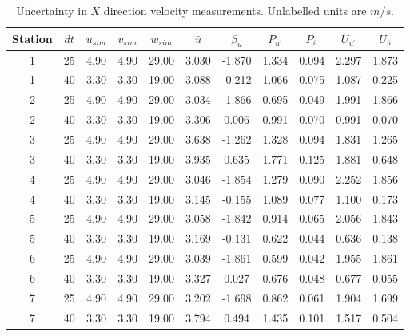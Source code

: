 \begin{table}[H]
\begin{center}
\begin{tabular}{|ccccccccccc|}
	\hline
	Station & $dt$ & $u_{sim}$ & $v_{sim}$ & $w_{sim}$ & $\bar{u}$ & $\beta_u$ & $P_{u^{\prime}}$ & $P_{\bar{u}}$ & $U_{u^{\prime}}$ & $U_{\bar{u}}$\\
	\hline
	1 & 25 & 4.90 & 4.90 & 29.00 & 3.030 & -1.870 & 1.334 & 0.094 & 2.297 & 1.873\\
	1 & 40 & 3.30 & 3.30 & 19.00 & 3.088 & -0.212 & 1.066 & 0.075 & 1.087 & 0.225\\
	2 & 25 & 4.90 & 4.90 & 29.00 & 3.034 & -1.866 & 0.695 & 0.049 & 1.991 & 1.866\\
	2 & 40 & 3.30 & 3.30 & 19.00 & 3.306 & 0.006 & 0.991 & 0.070 & 0.991 & 0.070\\
	3 & 25 & 4.90 & 4.90 & 29.00 & 3.638 & -1.262 & 1.328 & 0.094 & 1.831 & 1.265\\
	3 & 40 & 3.30 & 3.30 & 19.00 & 3.935 & 0.635 & 1.771 & 0.125 & 1.881 & 0.648\\
	4 & 25 & 4.90 & 4.90 & 29.00 & 3.046 & -1.854 & 1.279 & 0.090 & 2.252 & 1.856\\
	4 & 40 & 3.30 & 3.30 & 19.00 & 3.145 & -0.155 & 1.089 & 0.077 & 1.100 & 0.173\\
	5 & 25 & 4.90 & 4.90 & 29.00 & 3.058 & -1.842 & 0.914 & 0.065 & 2.056 & 1.843\\
	5 & 40 & 3.30 & 3.30 & 19.00 & 3.169 & -0.131 & 0.622 & 0.044 & 0.636 & 0.138\\
	6 & 25 & 4.90 & 4.90 & 29.00 & 3.039 & -1.861 & 0.599 & 0.042 & 1.955 & 1.861\\
	6 & 40 & 3.30 & 3.30 & 19.00 & 3.327 & 0.027 & 0.676 & 0.048 & 0.677 & 0.055\\
	7 & 25 & 4.90 & 4.90 & 29.00 & 3.202 & -1.698 & 0.862 & 0.061 & 1.904 & 1.699\\
	7 & 40 & 3.30 & 3.30 & 19.00 & 3.794 & 0.494 & 1.435 & 0.101 & 1.517 & 0.504\\
	\hline
\end{tabular}
\caption{Uncertainty in $X$ direction velocity measurements. Unlabelled units are $m/s$.}
\label{table:uncertainties_u}
\end{center}
\end{table}
